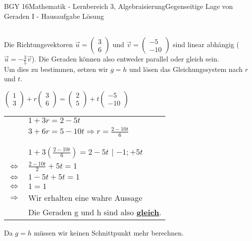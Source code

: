 \documentclass[oneside,openany,headings=optiontotoc,11pt,numbers=noenddot]{scrreprt}
\begin{document}
\begin{worksheet}{BGY 16}{Mathematik - Lernbereich 3, Algebraisierung}{Gegenseitige Lage von Geraden I - Hausaufgabe Lösung}
\begin{framed}
\begin{tabularx}{\textwidth}{XX}
			\end{tabularx}
			Die Richtungsvektoren \(\vec{u} = \left(\begin{array}{c}3\\6\end{array}\right)\) und \(\vec{v} = \left(\begin{array}{c}-5\\-10\end{array}\right)\) sind \color{blue}linear abhängig \normalcolor{} (\(\vec{u} = -\frac{3}{5}\vec{v}\)). Die Geraden können also entweder \color{codegreen}parallel\normalcolor{} oder \color{red}gleich\normalcolor{} sein.\\
			Um dies zu bestimmen, setzen wir \(g=h\) und lösen das Gleichungssystem nach \(r\) und \(t\).\\
			\par\noindent
			\par\noindent
			\(\left(\begin{array}{c}1\\3\end{array}\right) + r\left(\begin{array}{c}3\\6\end{array}\right) = \left(\begin{array}{c}2\\5\end{array}\right) + t\left(\begin{array}{c}-5\\-10\end{array}\right)\)
			\begin{center}
				\begin{tabular}{cl}
					&\(1 + 3r = 2 - 5t\)\\
					&\(3 + 6r = 5 - 10t \Rightarrow r = \frac{2 - 10t}{6}\)\\
					\\
					\hline\\
					\par
					&\(1 + 3(\frac{2 - 10t}{6}) = 2 -5t\) | \(-1; +5t\)\\
					\(\Leftrightarrow\) & \(\frac{2 - 10t}{2} + 5t = 1\)\\
					\(\Leftrightarrow\) & \(1 - 5t + 5t = 1\)\\
					\(\Leftrightarrow\) & \(1 = 1\)\\
					\(\Rightarrow\) & Wir erhalten eine wahre Aussage\\
					& Die Geraden g und h sind also \textbf{\underline{gleich}}.
				\end{tabular}				
			\end{center}
			Da \(g=h\) müssen wir keinen Schnittpunkt mehr berechnen.		
		\end{framed}
		

\end{worksheet}
\end{document}
